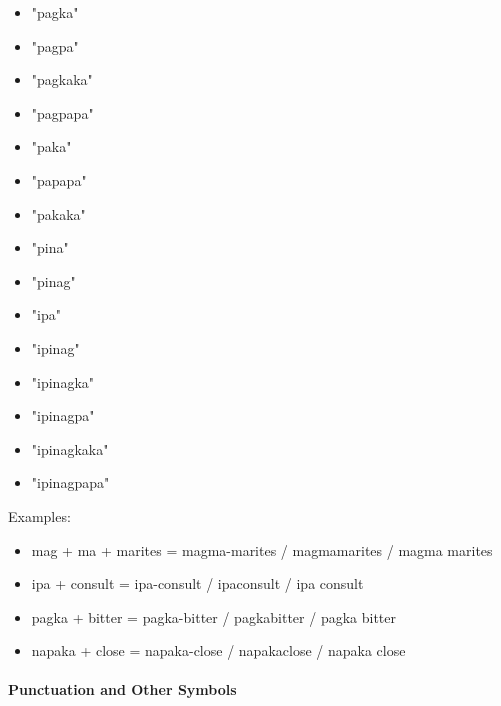 \documentclass[journal]{./IEEE/IEEEtran}
\begin{document}
\begin{multicols}{3}
\begin{itemize}
      \item "pagka" \\
      \item "pagpa" \\
      \item "pagkaka" \\
      \item "pagpapa" \\
      \item "paka" \\
      \item "papapa" \\
      \item "pakaka" \\
      \item "pina" \\
      \item "pinag" \\
      \item "ipa" \\
      \item "ipinag" \\
      \item "ipinagka" \\
      \item "ipinagpa" \\
      \item "ipinagkaka" \\
      \item "ipinagpapa" \\
      
    \end{itemize}
\end{multicols}

Examples:

\begin{itemize}
  \item mag + ma + marites = magma-marites / magmamarites / magma marites \\
  \item ipa + consult = ipa-consult / ipaconsult / ipa consult \\
  \item pagka + bitter = pagka-bitter / pagkabitter / pagka bitter \\
  \item napaka + close = napaka-close / napakaclose / napaka close \\
\end{itemize}

\paragraph{Punctuation and Other Symbols}
\end{document}
